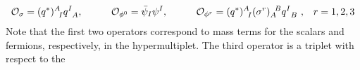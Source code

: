 \documentclass[12pt]{article}
\begin{document}
\begin{eqnarray}
{\cal O}_{\sigma}=(q^*)^A_{\;\;I} q_{\;\;A}^I,  \hspace{0.4 in} {\cal O}_{\phi^0}= \bar \psi_I \psi^I,  \hspace{0.4 in}{\cal O}_{\phi^r}=  (q^*) ^A_{\;\;I}  (\sigma^r)_A^{\;\; B}  {q^I}_B\,\,, \,\,\,\,\,r=1,2,3
\end{eqnarray}
Note that the first two operators correspond to mass terms for the scalars and fermions, respectively, in the hypermultiplet. The third operator is a triplet with respect to the
\end{document}
